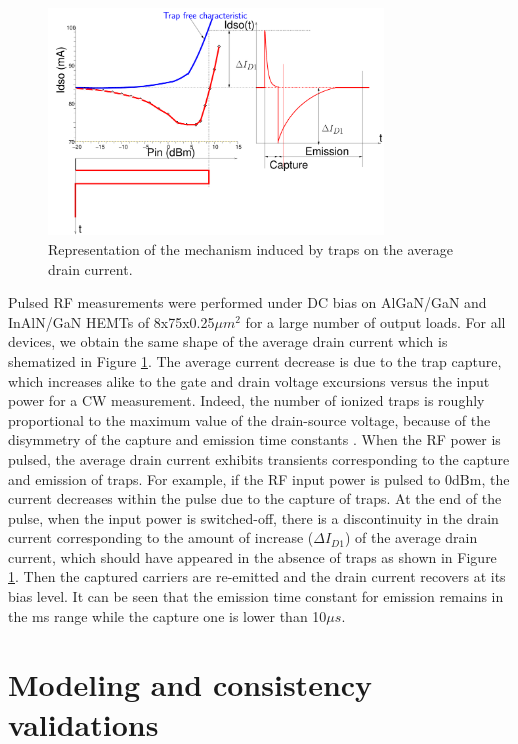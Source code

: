 \documentclass[conference]{IEEEtran}
\begin{document}
\begin{figure}[ht!] %
    \centering
    \includegraphics[width=3.5in]{Courant_2.pdf}
    \caption{Representation of the mechanism induced by traps on the average drain current.}
    \label{Courant_2}
\end{figure}

Pulsed RF measurements were performed under DC bias on  AlGaN/GaN and InAlN/GaN HEMTs of 8x75x0.25$\mu m^2$ for a large number of output loads. For all devices, we obtain the same shape of the average drain current which is shematized in Figure \ref{Courant_2}. The average current decrease is due to the trap capture, which increases alike to the gate and drain voltage excursions versus the input power for a CW measurement. Indeed, the number of ionized traps is roughly proportional to the maximum value of the drain-source voltage, because of the disymmetry of the capture and emission time constants \cite{163456}.  When the RF power is pulsed, the average drain current exhibits transients  corresponding to the capture and emission of traps. For example, if the RF input power is pulsed to 0dBm, the current decreases  within the pulse due to the capture of traps. At the end of the pulse, when the input power is switched-off, there is a discontinuity in the drain current corresponding to the amount of increase ($\Delta I_{D1}$) of the average drain current, which should have appeared in the absence of traps as shown in Figure \ref{Courant_2}. Then the captured carriers are re-emitted and the drain current recovers at its bias level. It can be seen that the emission time constant for emission remains in the ms range while the capture one is lower than 10$\mu s$.



\section{Modeling and consistency validations}
\end{document}
